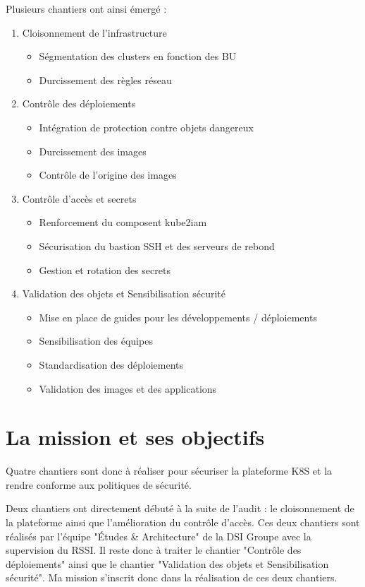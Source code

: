 Plusieurs chantiers ont ainsi émergé :
\begin{enumerate}
    \item Cloisonnement de l'infrastructure
    \begin{itemize}
        \item Ségmentation des clusters en fonction des \ac{BU}
        \item Durcissement des règles réseau
    \end{itemize}
    \item Contrôle des déploiements
        \begin{itemize}
        \item Intégration de protection contre objets dangereux
        \item Durcissement des images
        \item Contrôle de l'origine des images
    \end{itemize}
    \item Contrôle d'accès et secrets
    \begin{itemize}
        \item Renforcement du composent kube2iam
        \item Sécurisation du bastion SSH et des serveurs de rebond
        \item Gestion et rotation des secrets
    \end{itemize}
    \item Validation des objets et Sensibilisation sécurité
    \begin{itemize}
        \item Mise en place de guides pour les développements / déploiements
        \item Sensibilisation des équipes
        \item Standardisation des déploiements
        \item Validation des images et des applications
    \end{itemize}
\end{enumerate}

\pagebreak

\section{La mission et ses objectifs}

Quatre chantiers sont donc à réaliser pour sécuriser la plateforme \ac{K8S} et la rendre conforme aux politiques de 
sécurité.

Deux chantiers ont directement débuté à la suite de l'audit : le cloisonnement de la plateforme ainsi que l'amélioration
du contrôle d'accès. Ces deux chantiers sont réalisés par l'équipe "Études \& Architecture" de la \ac{DSI} Groupe avec
la supervision du \ac{RSSI}.
\newline Il reste donc à traiter le chantier "Contrôle des déploiements" ainsi que le chantier "Validation des objets et 
Sensibilisation sécurité". Ma mission s'inscrit donc dans la réalisation de ces deux chantiers.


